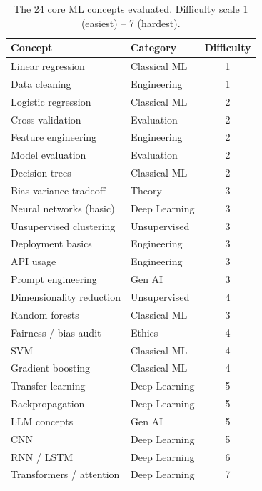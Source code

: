\documentclass[10pt,twocolumn]{article}
\begin{document}
\begin{table}[h]
\centering
\caption{The 24 core ML concepts evaluated. Difficulty scale 1 (easiest) -- 7 (hardest).}
\label{tab:concepts}
\small
\begin{tabular}{llc}
\toprule
\textbf{Concept} & \textbf{Category} & \textbf{Difficulty} \\
\midrule
Linear regression          & Classical ML   & 1 \\
Data cleaning              & Engineering    & 1 \\
Logistic regression        & Classical ML   & 2 \\
Cross-validation           & Evaluation     & 2 \\
Feature engineering        & Engineering    & 2 \\
Model evaluation           & Evaluation     & 2 \\
Decision trees             & Classical ML   & 2 \\
Bias-variance tradeoff     & Theory         & 3 \\
Neural networks (basic)    & Deep Learning  & 3 \\
Unsupervised clustering    & Unsupervised   & 3 \\
Deployment basics          & Engineering    & 3 \\
API usage                  & Engineering    & 3 \\
Prompt engineering         & Gen AI         & 3 \\
Dimensionality reduction   & Unsupervised   & 4 \\
Random forests             & Classical ML   & 3 \\
Fairness / bias audit      & Ethics         & 4 \\
SVM                        & Classical ML   & 4 \\
Gradient boosting          & Classical ML   & 4 \\
Transfer learning          & Deep Learning  & 5 \\
Backpropagation            & Deep Learning  & 5 \\
LLM concepts               & Gen AI         & 5 \\
CNN                        & Deep Learning  & 5 \\
RNN / LSTM                 & Deep Learning  & 6 \\
Transformers / attention   & Deep Learning  & 7 \\
\bottomrule
\end{tabular}
\end{table}
\end{document}
